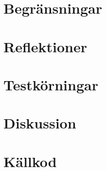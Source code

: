 \documentclass[a4paper, 12pt]{article}
\begin{document}
\section{Begränsningar}

\section{Reflektioner}

\section{Testkörningar}

\section{Diskussion}

\section{Källkod}
\end{document}
